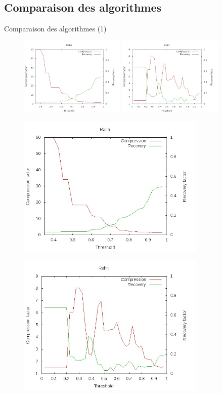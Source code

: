 \documentclass[10pt]{beamer}
\begin{document}
\subsection{Comparaison des algorithmes}

\begin{frame}{Comparaison des algorithmes (1)}
 {
\begin{figure}
\centering
\includegraphics[width = 5cm]{images/Rahn77.jpg} \hspace{0.5cm}
\includegraphics[width = 5cm]{images/RahnDiag.jpg}
\end{figure}}

 {
\begin{figure}
\centering
\includegraphics[width = 9cm]{images/Rahn77.jpg}
\end{figure}}

 {
\begin{figure}
\centering
\includegraphics[width = 9cm]{images/RahnDiag.jpg}
\end{figure}}
\end{frame}
\end{document}
